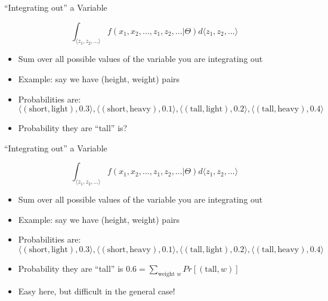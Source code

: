 \documentclass[aspectratio=169]{beamer}
\begin{document}
\begin{frame}{``Integrating out'' a Variable}

	$$\int_{\langle z_1, z_2, ...\rangle} f (x_1, x_2, ..., z_1, z_2, ... | \Theta) d\langle z_1,z_2,...\rangle$$
\begin{itemize}
\item Sum over all possible values of the variable you are integrating out
\item Example: say we have (height, weight) pairs
\item Probabilities are: $$\langle (\textrm{short}, \textrm{light}), 0.3 \rangle, 
	\langle (\textrm{short}, \textrm{heavy}), 0.1 \rangle, 
	\langle (\textrm{tall}, \textrm{light}), 0.2 \rangle, 
	\langle (\textrm{tall}, \textrm{heavy}), 0.4 \rangle$$
\item[] Probability they are ``tall'' is?
\end{itemize}
\end{frame}
\begin{frame}{``Integrating out'' a Variable}

	$$\int_{\langle z_1, z_2, ...\rangle} f (x_1, x_2, ..., z_1, z_2, ... | \Theta) d\langle z_1,z_2,...\rangle$$
\begin{itemize}
\item Sum over all possible values of the variable you are integrating out
\item Example: say we have (height, weight) pairs
\item Probabilities are: $$\langle (\textrm{short}, \textrm{light}), 0.3 \rangle, 
	\langle (\textrm{short}, \textrm{heavy}), 0.1 \rangle, 
	\langle (\textrm{tall}, \textrm{light}), 0.2 \rangle, 
	\langle (\textrm{tall}, \textrm{heavy}), 0.4 \rangle$$
\item Probability they are ``tall'' is $0.6 = \sum_{\textrm{weight } w} Pr[(\textrm{tall}, w)]$
\item Easy here, but difficult in the general case!

\end{itemize}
\end{frame}
\end{document}

